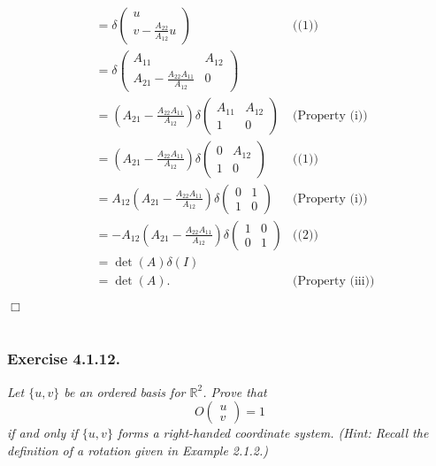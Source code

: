 \documentclass{article}
\begin{document}
\begin{enumerate}
\begin{align*}
&= \delta\begin{pmatrix} u \\ v - \frac{A_{22}}{A_{12}} u \end{pmatrix}
  &\text{((1))} \\
&= \delta\begin{pmatrix}
    A_{11} & A_{12} \\
    A_{21}-\frac{A_{22}A_{11}}{A_{12}} & 0
  \end{pmatrix} \\
&= \left( A_{21}-\frac{A_{22}A_{11}}{A_{12}} \right)
  \delta\begin{pmatrix}
    A_{11} & A_{12} \\
    1 & 0
  \end{pmatrix}
  &\text{(Property (i))} \\
&= \left( A_{21}-\frac{A_{22}A_{11}}{A_{12}} \right)
  \delta\begin{pmatrix}
    0 & A_{12} \\
    1 & 0
  \end{pmatrix}
  &\text{((1))} \\
&= A_{12}\left( A_{21}-\frac{A_{22}A_{11}}{A_{12}} \right)
  \delta\begin{pmatrix}
    0 & 1 \\
    1 & 0
  \end{pmatrix}
  &\text{(Property (i))} \\
&= -A_{12}\left( A_{21}-\frac{A_{22}A_{11}}{A_{12}} \right)
  \delta\begin{pmatrix}
    1 & 0 \\
    0 & 1
  \end{pmatrix}
  &\text{((2))} \\
&= \det(A)\delta(I) \\
&= \det(A).
  &\text{(Property (iii))}
\end{align*}


\end{enumerate}
$\Box$ \\\\






\subsubsection*{Exercise 4.1.12.}
\emph{Let $\{ u, v \}$ be an ordered basis for $\mathbb{R}^2$.
Prove that
$$O\begin{pmatrix} u \\ v \end{pmatrix} = 1$$
if and only if $\{ u, v \}$ forms a right-handed coordinate system.
(Hint: Recall the definition of a rotation given in Example 2.1.2.)} \\
\end{document}
